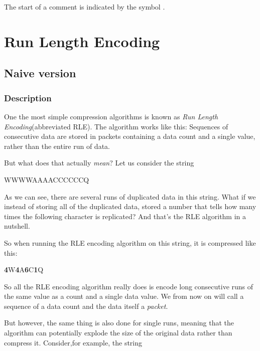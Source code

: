 \begin{refsection}
The start of a comment is indicated by the symbol \commentsymbol.

\section{Run Length Encoding}
\label{sec:rle}

\subsection{Naive version}
\label{sec:naive-version}

\subsubsection{Description}
\label{sec:description}

One the most simple compression algorithms is known as \textit{Run
  Length Encoding}(abbreviated
RLE)\cite{nagarajan11:_enhan_approac_run_lengt_encod_schem}.
The algorithm works like this: Sequences of consecutive data are
stored in packets containing a data count and a single value, rather
than the entire run of data.

But what does that actually \textit{mean}? Let us consider the string

\begin{indentpar}
  WWWWAAAACCCCCCQ
\end{indentpar}

As we can see, there are several runs of duplicated data in this
string. What if we instead of storing all of the duplicated data,
stored a number that tells how many times the following character
is replicated? And that's the RLE algorithm in a nutshell.

So when running the RLE encoding algorithm on this string, it is
compressed like this:

\newcommand{\pkt}[2]{\textbf{#1}#2}

\begin{indentpar}
  \pkt{4}{W}\pkt{4}{A}\pkt{6}{C}\pkt{1}{Q}
\end{indentpar}

So all the RLE encoding algorithm really does is encode long
consecutive runs of the same value as a count and a single data
value. We from now on will call a sequence of a data count and the
data itself a \textit{packet}.

But however, the same thing is also done for single runs, meaning that
the algorithm can potentially explode the size of the original data
rather than compress it. Consider,for example, the string


\end{refsection}
